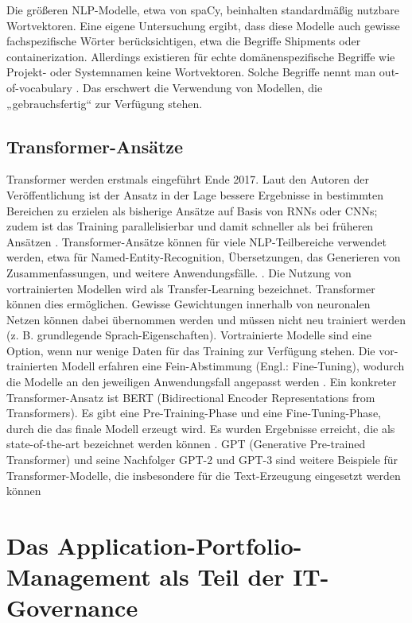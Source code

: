 Die größeren NLP-Modelle, etwa von spaCy, beinhalten standardmäßig nutzbare Wortvektoren. Eine eigene Untersuchung ergibt, dass diese Modelle auch gewisse fachspezifische Wörter berücksichtigen, etwa die Begriffe Shipments oder containerization. Allerdings existieren für echte domänenspezifische Begriffe wie Projekt- oder Systemnamen keine Wortvektoren. Solche Begriffe nennt man out-of-vocabulary \cite{spacy2}. Das erschwert die Verwendung von Modellen, die „gebrauchsfertig“ zur Verfügung stehen. 

\subsection{Transformer-Ansätze}
Transformer werden erstmals eingeführt Ende 2017. Laut den Autoren der Veröffentlichung ist der Ansatz in der Lage bessere Ergebnisse in bestimmten Bereichen zu erzielen als bisherige Ansätze auf Basis von RNNs oder CNNs; zudem ist das Training parallelisierbar und damit schneller als bei früheren Ansätzen \cite{Vaswani}. Transformer-Ansätze können für viele NLP-Teilbereiche verwendet werden, etwa für Named-Entity-Recognition, Übersetzungen, das Generieren von Zusammenfassungen, und weitere Anwendungsfälle. \cite[S. 25-26]{Gupta}. Die Nutzung von vortrainierten Modellen wird als Transfer-Learning bezeichnet. Transformer können dies ermöglichen. Gewisse Gewichtungen innerhalb von neuronalen Netzen können dabei übernommen werden und müssen nicht neu trainiert werden (z. B. grundlegende Sprach-Eigenschaften). Vortrainierte Modelle sind eine Option, wenn nur wenige Daten für das Training zur Verfügung stehen. Die vor-trainierten Modell erfahren eine Fein-Abstimmung (Engl.: Fine-Tuning), wodurch die Modelle an den jeweiligen Anwendungsfall angepasst werden \cite[S. 45-56]{Alom}.
Ein konkreter Transformer-Ansatz ist BERT (Bidirectional Encoder Representations from Transformers). Es gibt eine Pre-Training-Phase und eine Fine-Tuning-Phase, durch die das finale Modell erzeugt wird. Es wurden Ergebnisse erreicht, die als state-of-the-art bezeichnet werden können \cite{devlin}. 
GPT (Generative Pre-trained Transformer) und seine Nachfolger GPT-2 und GPT-3 sind weitere Beispiele für Transformer-Modelle, die insbesondere für die Text-Erzeugung eingesetzt werden können \cite{Brown}

\section{Das Application-Portfolio-Management als Teil der IT-Governance}

